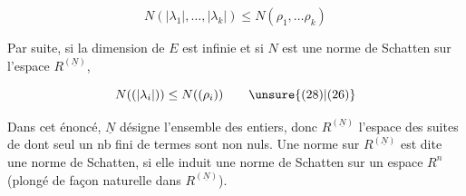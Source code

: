 \[
N(|\lambda_1|,\ldots,|\lambda_k|)\leq N(\rho_1,\ldots\rho_k)\tag*{(27)}
\]

 Par suite, si la dimension de $E$ est infinie et si $N$ est une norme de Schatten sur  l'espace $R^{(\underline N)}$,  

\[
N((|\lambda_i|))\leq N((\rho_i))\tag*{\unsure{(28)|(26)}}
\]

Dans cet énoncé, $\underline N$ désigne l'ensemble des entiers, donc $R^{(\underline N)}$ l'espace des suites de   dont seul un nb fini de termes sont non nuls. Une norme sur $R^{(\underline N)}$ est dite une norme de Schatten, si elle induit une norme de Schatten sur  un espace $R^n$ (plongé de façon naturelle dans $R^{(\underline N)}$).

